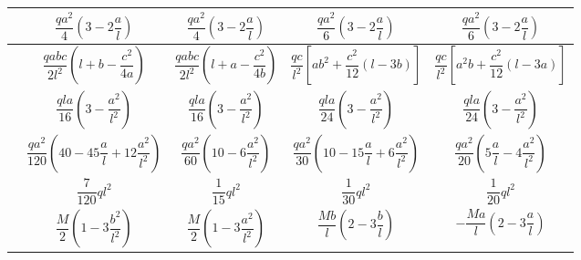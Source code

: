 \begin{table}[htb]
{\begin{tabular}{m{4cm}cccc}
			 & \large{$\dfrac{qa^2}{4}\left(3-2\dfrac{a}{l}\right)$} & \large{$\dfrac{qa^2}{4}\left(3-2\dfrac{a}{l}\right)$} & \large{$\dfrac{qa^2}{6}\left(3-2\dfrac{a}{l}\right)$} & \large{$\dfrac{qa^2}{6}\left(3-2\dfrac{a}{l}\right)$} \\ \midrule
			 & \large{$\dfrac{qabc}{2l^2}\left(l+b-\dfrac{c^2}{4a}\right)$} & \large{$\dfrac{qabc}{2l^2}\left(l+a-\dfrac{c^2}{4b}\right)$} & \large{$\dfrac{qc}{l^2}\left[ab^2+\dfrac{c^2}{12}\left(l-3b\right)\right]$} & \large{$\dfrac{qc}{l^2}\left[a^2b+\dfrac{c^2}{12}\left(l-3a\right)\right]$} \\ \midrule
			 & \large{$\dfrac{qla}{16}\left(3-\dfrac{a^2}{l^2}\right)$} & \large{$\dfrac{qla}{16}\left(3-\dfrac{a^2}{l^2}\right)$} & \large{$\dfrac{qla}{24}\left(3-\dfrac{a^2}{l^2}\right)$} & \large{$\dfrac{qla}{24}\left(3-\dfrac{a^2}{l^2}\right)$} \\ \midrule
			 & \large{$\dfrac{qa^2}{120}\left(40-45\dfrac{a}{l}+12\dfrac{a^2}{l^2}\right)$} & \large{$\dfrac{qa^2}{60}\left(10-6\dfrac{a^2}{l^2}\right)$} & \large{$\dfrac{qa^2}{30}\left(10-15\dfrac{a}{l}+6\dfrac{a^2}{l^2}\right)$} & \large{$\dfrac{qa^2}{20}\left(5\dfrac{a}{l}-4\dfrac{a^2}{l^2}\right)$} \\ \midrule
			 & \large{$\dfrac{7}{120}ql^2$} & \large{$\dfrac{1}{15}ql^2$} & \large{$\dfrac{1}{30}ql^2$} & \large{$\dfrac{1}{20}ql^2$} \\ \midrule
			 & \large{$\dfrac{M}{2}\left(1-3\dfrac{b^2}{l^2}\right)$} & \large{$\dfrac{M}{2}\left(1-3\dfrac{a^2}{l^2}\right)$} & \large{$\dfrac{Mb}{l}\left(2-3\dfrac{b}{l}\right)$} & \large{$-\dfrac{Ma}{l}\left(2-3\dfrac{a}{l}\right)$} \\ \midrule
		\end{tabular}
	} %
\end{table}



\newpage

